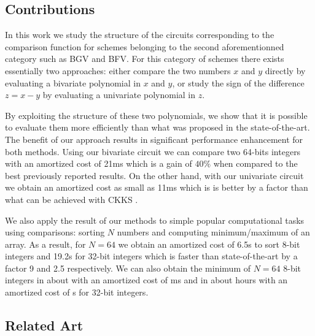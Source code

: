 \subsection{Contributions}
In this work we study the structure of the circuits corresponding to the comparison function for schemes belonging to the second aforementionned category such as BGV and BFV. For this category of schemes there exists essentially two approaches: either compare the two numbers $x$ and $y$ directly by evaluating a bivariate polynomial in $x$ and $y$, or study the sign of the difference $z=x-y$ by evaluating a univariate polynomial in $z$.

By exploiting the structure of these two polynomials, we show that it is possible to evaluate them more efficiently than what was proposed in the state-of-the-art. The benefit of our approach results in significant performance enhancement for both methods. Using our bivariate circuit we can compare two 64-bits integers with an amortized cost of 21ms which is a gain of $40\%$ when compared to the best previously reported results. On the other hand, with our univariate circuit we obtain an amortized cost as small as 11ms which is is better by a factor  than what can be achieved with CKKS . 

We also apply the result of our methods to simple popular computational tasks using comparisons: sorting $N$ numbers and computing minimum/maximum of an array. As a result, for $N=64$ we obtain an amortized cost of 6.5s to sort 8-bit integers and 19.2s for 32-bit integers which is faster than state-of-the-art by a factor 9 and 2.5 respectively. We can also obtain the minimum of $N=64$ 8-bit integers in about  with an amortized cost of ms and in about hours with an amortized cost of s for 32-bit integers.

\subsection{Related Art}
\label{sec:related-art}





